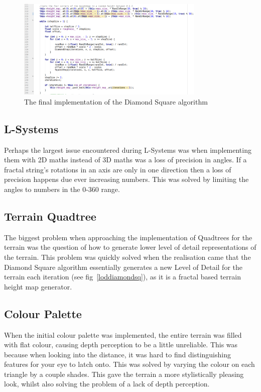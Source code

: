 \documentclass[a4paper,10pt]{report}
\begin{document}
\begin{figure}[h!]
    \centering
  \includegraphics[width=0.8\textwidth]{Images/Code-Snippets/DiamondSquareAlgorithm.png}
 \caption{The final implementation of the Diamond Square algorithm}
 \label{fig:diamondsquareimpl}
\end{figure}

\subsection{L-Systems}

Perhaps the largest issue encountered during L-Systems was when implementing them with 2D maths instead of 3D maths was a loss of precision in angles. If a fractal string's rotations in an axis are only in  one direction then a loss of precision happens due ever increasing numbers. This was solved by limiting the angles to numbers in the 0-360 range.

\subsection{Terrain Quadtree}

The biggest problem when approaching the implementation of Quadtrees for the terrain was the question of how to generate lower level of detail representations of the terrain. This problem was quickly solved when the realisation came that the Diamond Square algorithm essentially generates a new Level of Detail for the terrain each iteration (see fig~\ref{loddiamondsq}), as it is a fractal based terrain height map generator. 

\subsection{Colour Palette}
When the initial colour palette was implemented, the entire terrain was filled with flat colour, causing depth perception to be a little unreliable. This was because when looking into the distance, it was hard to find distinguishing features for your eye to latch onto. This was solved by varying the colour on each triangle by a couple shades. This gave the terrain a more stylistically pleasing look, whilst also solving the problem of a lack of depth perception. 
\end{document}

